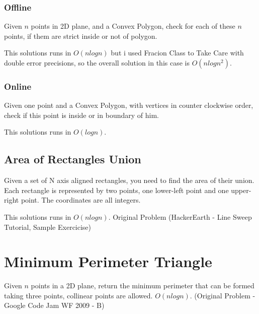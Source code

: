 \documentclass{report}
\begin{document}
            \subsubsection{Offline}
            Given $n$ points in 2D plane, and a Convex Polygon, check for each of these $n$ points, if them are strict inside or not of polygon.
            
            This solutions runs in $O(nlogn)$ but i used Fracion Class to Take Care with double error precisions, so the overall solution in this case is $O(nlogn^2)$.
            
            
            
            \subsubsection{Online}
            Given one point and a Convex Polygon, with vertices in counter clockwise order, check if this point is inside or in boundary of him.
            
            This solutions runs in $O(logn)$.
            
            
        
        \subsection{Area of Rectangles Union}
        Given a set of N axis aligned rectangles, you need to find the area of their union. Each rectangle is represented by two points, one lower-left point and one upper-right point. The coordinates are all integers.
        
        This solutions runs in $O(nlogn)$. Original Problem (HackerEarth - Line Sweep Tutorial, Sample Exercicise)
    \section{Minimum Perimeter Triangle}
    Given $n$ points in a 2D plane, return the minimum perimeter that can be formed taking three points, collinear points are allowed. $O(nlogn)$. (Original Problem - Google Code Jam WF 2009 - B)
    
    
\end{document}
